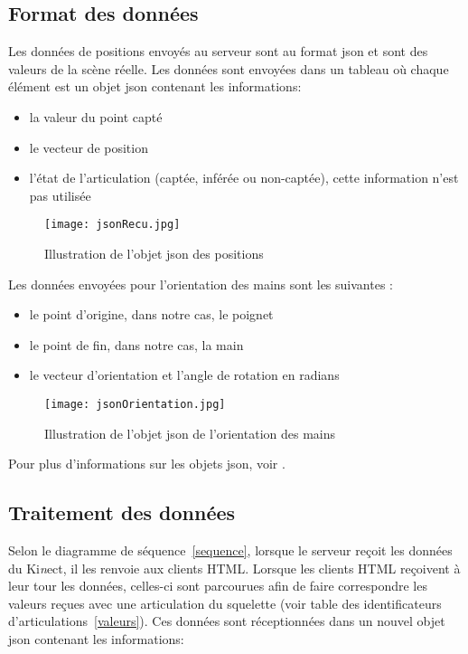 \subsection{Format des données}  \label{format}
Les données de positions envoyés au serveur sont au \textsf{format json} et sont des valeurs de la scène réelle. Les données sont envoyées dans un tableau où chaque élément est un \textsf{objet json} contenant les informations: 
\begin{itemize}
\item la valeur du point capté
\item le vecteur de position
\item l'état de l'articulation (captée, inférée ou non-captée), cette information n'est pas utilisée 
\end{itemize}

\begin{figure}[H]
\centering
\texttt{[image: jsonRecu.jpg]}
\caption{\label{jsonrecu} Illustration de l'objet json des positions}
\end{figure}

Les données envoyées pour l'\textsf{orientation des mains} sont les suivantes : 
\begin{itemize}
\item le point d'origine, dans notre cas, le poignet
\item le point de fin, dans notre cas, la main
\item le vecteur d'orientation et l'angle de rotation en radians 
\end{itemize}

\begin{figure}[H]
\centering
\texttt{[image: jsonOrientation.jpg]}
\caption{\label{jsonrecu} Illustration de l'objet json de l'orientation des mains}
\end{figure}
Pour plus d'informations sur les objets json, voir \cite{json}.

\subsection{Traitement des données} \label{traitement}
Selon le diagramme de séquence~\ref{sequence}, lorsque le serveur reçoit les données du Ki\textit{n}ect, il les renvoie aux clients HTML. Lorsque les clients HTML reçoivent à leur tour les données, celles-ci sont parcourues afin de faire correspondre les valeurs reçues avec une articulation du squelette (voir table des identificateurs d'articulations~\ref{valeurs}). Ces données sont réceptionnées dans un \textsf{nouvel objet json} contenant les informations: 

